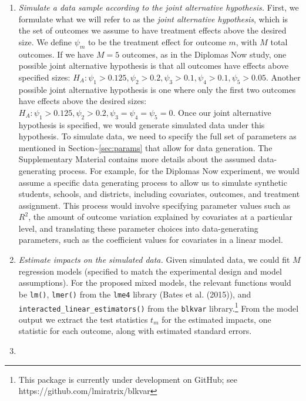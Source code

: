 \documentclass[
]{article}
\begin{document}
\begin{enumerate}
\def\labelenumi{\arabic{enumi}.}
\item
  \emph{Simulate a data sample according to the joint alternative
  hypothesis.} First, we formulate what we will refer to as the
  \emph{joint alternative hypothesis}, which is the set of outcomes we
  assume to have treatment effects above the desired size. We define
  \(\psi_m\) to be the treatment effect for outcome \(m\), with \(M\)
  total outcomes. If we have \(M = 5\) outcomes, as in the Diplomas Now
  study, one possible joint alternative hypothesis is that all outcomes
  have effects above specified sizes:
  \(H_A: \psi_1 > 0.125, \psi_2 > 0.2, \psi_3 > 0.1, \psi_4 > 0.1, \psi_5 > 0.05\).
  Another possible joint alternative hypothesis is one where only the
  first two outcomes have effects above the desired sizes:
  \(H_A: \psi_1 > 0.125, \psi_2 > 0.2, \psi_3 = \psi_4 = \psi_5 = 0\).
  Once our joint alternative hypothesis is specified, we would generate
  simulated data under this hypothesis. To simulate data, we need to
  specify the full set of parameters as mentioned in
  Section\textasciitilde{}\ref{sec:params} that allow for data
  generation. The Supplementary Material contains more details about the
  assumed data-generating process. For example, for the Diplomas Now
  experiment, we would assume a specific data generating process to
  allow us to simulate synthetic students, schools, and districts,
  including covariates, outcomes, and treatment assignment. This process
  would involve specifying parameter values such as \(R^2\), the amount
  of outcome variation explained by covariates at a particular level,
  and translating these parameter choices into data-generating
  parameters, such as the coefficient values for covariates in a linear
  model.
\item
  \emph{Estimate impacts on the simulated data.} Given simulated data,
  we could fit \(M\) regression models (specified to match the
  experimental design and model assumptions). For the proposed mixed
  models, the relevant functions would be \texttt{lm()}, \texttt{lmer()}
  from the \texttt{lme4} library (Bates et al. (2015)), and
  \texttt{interacted\_linear\_estimators()} from the \texttt{blkvar}
  library.\footnote{This package is currently under development on GitHub; see https://github.com/lmiratrix/blkvar}
  From the model output we extract the test statistics \(t_m\) for the
  estimated impacts, one statistic for each outcome, along with
  estimated standard errors.
\item

\end{enumerate}
\end{document}
